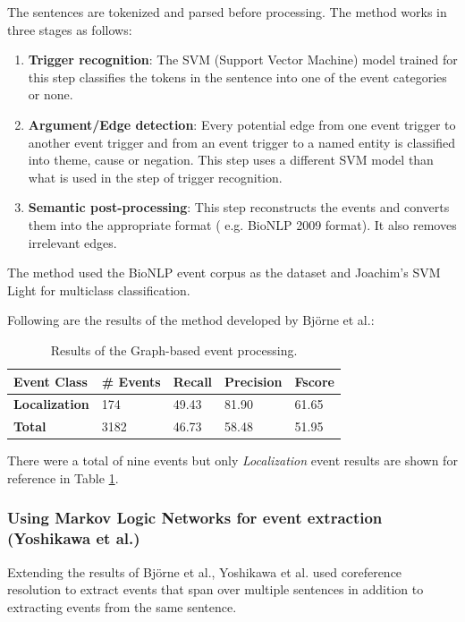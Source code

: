 The sentences are tokenized and parsed before processing. The method works in three stages as follows: 

\begin{enumerate}
\item \textbf{Trigger recognition}: The SVM (Support Vector Machine) model trained for this step classifies the tokens in the sentence into one of the event categories or none.

\item \textbf{Argument/Edge detection}: Every potential edge from one event trigger to another event trigger and from an event trigger to a named entity is classified into theme, cause or negation. This step uses a different SVM model than what is used in the step of trigger recognition.

\item \textbf{Semantic post-processing}: This step reconstructs the events and converts them into the appropriate format ( e.g. BioNLP 2009 format). It also removes irrelevant edges. 
\end{enumerate}

The method used the BioNLP event corpus as the dataset and Joachim's SVM Light \cite{bjorne2009extracting} for multiclass classification. 

Following are the results of the method developed by Björne et al.:

\begin{table}[h]
\centering
\begin{tabular}{|l|l|l|l|l|}
\hline
\textbf{Event Class} & \textbf{\# Events} & \textbf{Recall} & \textbf{Precision} & \textbf{Fscore} \\ \hline
\textbf{Localization} & 174 & 49.43 & 81.90 & 61.65 \\
\textbf{Total} & 3182 & 46.73 & 58.48 & 51.95\\ \hline
\end{tabular}
\caption{Results of the Graph-based event processing.}\label{tab:Jari}
\end{table}

There were a total of nine events but only \textit{Localization} event results are shown for reference in Table \ref{tab:Jari}.

\subsubsection{Using Markov Logic Networks for event extraction (Yoshikawa et al.)}

Extending the results of Björne et al., Yoshikawa et al. \cite{yoshikawa2011coreference} used coreference resolution to extract events that span over multiple sentences in addition to extracting events from the same sentence. 

